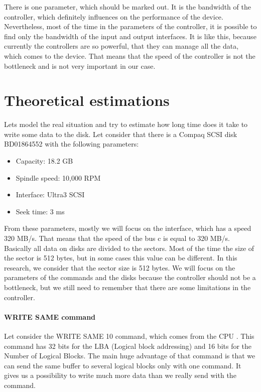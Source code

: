 There is one parameter, which should be marked out. It is the bandwidth of the controller, which definitely influences on the performance of the device. Nevertheless, most of the time in the parameters of the controller, it is possible to find only the bandwidth of the input and output interfaces. It is like this, because currently the controllers are so powerful, that they can manage all the data, which comes to the device. That means that the speed of the controller is not the bottleneck and is not very important in our case.

\section{Theoretical estimations}
\label{sec:theory_est}

Lets model the real situation and try to estimate how long time does it take to write some data to the disk. Let consider that there is a Compaq SCSI disk BD01864552 with the following parameters: 
\begin{itemize}
	\setlength{\itemsep}{-2mm}
	\item Capacity: 18.2 GB
	\item Spindle speed: 10,000 RPM
	\item Interface: Ultra3 SCSI
	\item Seek time: 3 ms
\end{itemize}
From these parameters, mostly we will focus on the interface, which has a speed 320 MB/s. That means that the speed of the bus c is equal to 320 MB/s. Basically all data on disks are divided to the sectors. Most of the time the size of the sector is 512 bytes, but in some cases this value can be different. In this research, we consider that the sector size is 512 bytes. We will focus on the parameters of the commands and the disks because the controller should not be a bottleneck, but we still need to remember that there are some limitations in the controller.

\paragraph{WRITE SAME command}
Let consider the WRITE SAME 10 command, which comes from the CPU \cite{scsi3_bc}. This command has 32 bits for the LBA (Logical block addressing) and 16 bits for the Number of Logical Blocks. The main huge advantage of that command is that we can send the same buffer to several logical blocks only with one command. It gives us a possibility to write much more data than we really send with the command.

